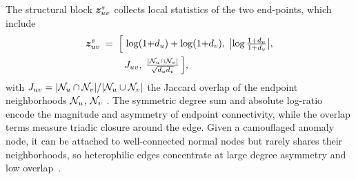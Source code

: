 The structural block $\bm{z}^{s}_{uv}$ collects local statistics of the two end-points, which include
\begin{equation}
\begin{aligned}
  \bm{z}^{s}_{uv} \;=\;
  \Bigl[\,&
    \log(1{+}d_u)+\log(1{+}d_v),\;
    \bigl|\log\tfrac{1+d_u}{1+d_v}\bigr|,\\
    &J_{uv},\;
    \tfrac{|\mathcal{N}_u\cap\mathcal{N}_v|}{\sqrt{d_u d_v}}
  \,\Bigr],
\end{aligned}
  \label{eq:structural}
\end{equation}
with $J_{uv}=|\mathcal{N}_u\cap\mathcal{N}_v|/|\mathcal{N}_u\cup\mathcal{N}_v|$ the Jaccard overlap of the endpoint neighborhoods $\mathcal{N}_u$, $\mathcal{N}_v$ .
The symmetric degree sum and absolute log-ratio encode the magnitude and asymmetry of endpoint connectivity, while the
overlap terms measure triadic closure around the edge.
Given a camouflaged anomaly node, it can be attached to well-connected normal nodes but rarely shares their neighborhoods, so heterophilic edges concentrate at large degree asymmetry and low overlap~\citep{CARE-GNN,PCGNN}.

